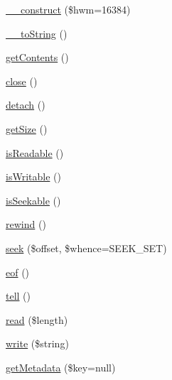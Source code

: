 \begin{DoxyCompactItemize}
\item 
\hyperlink{classGuzzleHttp_1_1Psr7_1_1BufferStream_aa4791b10406d77e1ca7e6bd335671328}{\+\_\+\+\_\+construct} (\$hwm=16384)
\item 
\hyperlink{classGuzzleHttp_1_1Psr7_1_1BufferStream_a263174c64e3f1690c1234de871312dfb}{\+\_\+\+\_\+to\+String} ()
\item 
\hyperlink{classGuzzleHttp_1_1Psr7_1_1BufferStream_aab2ed71f0cfa742e24025ad761a0cd25}{get\+Contents} ()
\item 
\hyperlink{classGuzzleHttp_1_1Psr7_1_1BufferStream_a1a5a3b008a4b806c90125ad4804973be}{close} ()
\item 
\hyperlink{classGuzzleHttp_1_1Psr7_1_1BufferStream_ae378709ce9283164cafbfe1b1fcf4190}{detach} ()
\item 
\hyperlink{classGuzzleHttp_1_1Psr7_1_1BufferStream_aad0e12c170462a9389ef6c5f95c71480}{get\+Size} ()
\item 
\hyperlink{classGuzzleHttp_1_1Psr7_1_1BufferStream_a4c7c5d714b07099f0f765573870cc70a}{is\+Readable} ()
\item 
\hyperlink{classGuzzleHttp_1_1Psr7_1_1BufferStream_a5d04843eba2948128ff79da1019a7034}{is\+Writable} ()
\item 
\hyperlink{classGuzzleHttp_1_1Psr7_1_1BufferStream_a0ce11381069f05f76393a5f032b432f7}{is\+Seekable} ()
\item 
\hyperlink{classGuzzleHttp_1_1Psr7_1_1BufferStream_a93beb4e6194db7b3ce2f39748d99fdc0}{rewind} ()
\item 
\hyperlink{classGuzzleHttp_1_1Psr7_1_1BufferStream_a0ac3c779324ec9a9534519f71aab5ad0}{seek} (\$offset, \$whence=S\+E\+E\+K\+\_\+\+S\+ET)
\item 
\hyperlink{classGuzzleHttp_1_1Psr7_1_1BufferStream_a41a46baafe72165dc167b7fd5e4053ae}{eof} ()
\item 
\hyperlink{classGuzzleHttp_1_1Psr7_1_1BufferStream_aac11a7ec7fcae9038f7beb6f374111a9}{tell} ()
\item 
\hyperlink{classGuzzleHttp_1_1Psr7_1_1BufferStream_a7c5ee28064aec7dcf831845c3f7b18e7}{read} (\$length)
\item 
\hyperlink{classGuzzleHttp_1_1Psr7_1_1BufferStream_a2cd1b760c6feef31b410f41940ec708b}{write} (\$string)
\item 
\hyperlink{classGuzzleHttp_1_1Psr7_1_1BufferStream_aa7a661e5c0549b50afc537a3d33db728}{get\+Metadata} (\$key=null)
\end{DoxyCompactItemize}


